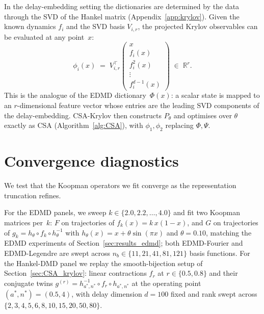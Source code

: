 \documentclass{article}
\theoremstyle{definition}
\begin{document}
In the delay-embedding setting the dictionaries are determined by the data
through the SVD of the Hankel matrix (Appendix~\ref{app:krylov}). Given the
known dynamics $f_i$ and the SVD basis $V_{i,r}$, the projected Krylov
observables can be evaluated at any point~$x$:
\[
  \phi_i(x) \;=\; V_{i,r}^\top
  \begin{pmatrix} x \\ f_i(x) \\ f_i^2(x) \\ \vdots \\ f_i^{d-1}(x) \end{pmatrix}
  \;\in\;\mathbb{R}^r.
\]
This is the analogue of the EDMD dictionary~$\Phi(x)$: a scalar state is
mapped to an $r$-dimensional feature vector whose entries are the leading
SVD components of the delay-embedding. CSA-Krylov then constructs $P_\theta$
and optimises over $\theta$ exactly as CSA (Algorithm~\ref{alg:CSA}), with
$\phi_1,\phi_2$ replacing $\Phi,\Psi$.



\section{Convergence diagnostics}
\label{sec:convergence}

We test that the Koopman operators we fit converge as the
representation truncation refines.

For the EDMD panels, we sweep $k\in\{2.0, 2.2,\ldots,4.0\}$ and fit two
Koopman matrices per~$k$: $F$ on trajectories of $f_k(x)=k\,x(1-x)$, and
$G$ on trajectories of $g_k=h_\theta\circ f_k\circ h_\theta^{-1}$ with
$h_\theta(x)=x+\theta\sin(\pi x)$ and $\theta=0.10$, matching the EDMD
experiments of Section~\ref{sec:results_edmd}; both EDMD-Fourier and
EDMD-Legendre are swept across $n_b\in\{11, 21, 41, 81, 121\}$ basis
functions.  For the Hankel-DMD panel we replay the smooth-bijection
setup of Section~\ref{sec:CSA_krylov}: linear contractions $f_r$ at
$r\in\{0.5, 0.8\}$ and their conjugate twins $g^{(r)}=h_{a^*,n^*}^{-1}
\circ f_r\circ h_{a^*,n^*}$ at the operating point $(a^*, n^*)=(0.5, 4)$,
with delay dimension $d=100$ fixed and rank swept across
$\{2,3,4,5,6,8,10,15,20,50,80\}$.
\end{document}
